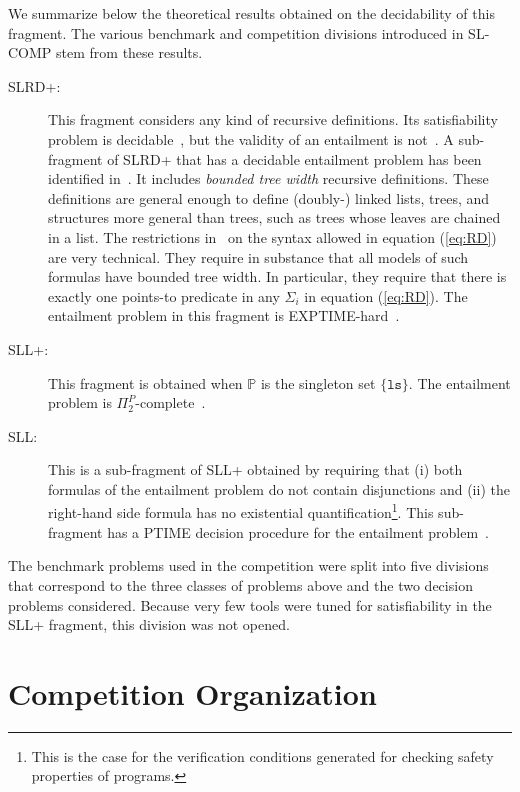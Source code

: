 \documentclass[twoside,11pt]{article}
\newcommand{\preds}{\mathbb{P}}
\newcommand{\ls}{\mathtt{ls}}
\begin{document}
We summarize below the theoretical results obtained on the decidability of this fragment.
The various benchmark and competition divisions introduced in SL-COMP stem from these results.
\begin{description}
\item[SLRD+:]
This fragment considers any kind of recursive definitions.
Its satisfiability problem is decidable~\cite{BrotherstonFGNP13},
but the validity of an entailment is not~\cite{AntonopoulosGHKO14}.
%
A sub-fragment of SLRD+ that has a decidable entailment problem has been identified in~\cite{IosifRS13}. It includes \emph{bounded tree width} recursive definitions.
These definitions are general enough to define (doubly-) linked lists, trees,
and structures more general than trees, such as trees whose leaves are chained in
a list. 
The restrictions in~\cite{IosifRS13} on the syntax allowed in equation (\ref{eq:RD}) are very technical. They require in substance that all models of such formulas have bounded tree width. 
In particular, they require that there is exactly one points-to predicate in any $\Sigma_i$ in equation (\ref{eq:RD}).
The entailment problem in this fragment is EXPTIME-hard~\cite{AntonopoulosGHKO14}.

\item[SLL+:]
This fragment is obtained when $\preds$ is the singleton set $\{\ls\}$. 
The entailment problem is $\Pi^P_2$-complete~\cite{AntonopoulosGHKO14}.

\item[SLL:]
This is a sub-fragment of SLL+ obtained by requiring that
(i) both formulas of the entailment problem do not contain disjunctions and 
(ii) the right-hand side formula has no existential quantification\footnote{This is the case for the verification conditions generated for checking safety properties of programs.}. 
This sub-fragment has a PTIME decision procedure for the entailment problem~\cite{CookHOPW11}.
\end{description}

The benchmark problems used in the competition were split into five divisions that correspond to the three classes of problems above and the two decision problems considered.
Because very few tools were tuned for satisfiability in the SLL+ fragment, this division was not opened.



\section{Competition Organization}
\end{document}
